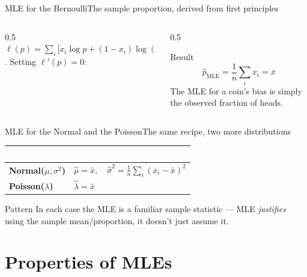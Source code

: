 \documentclass[aspectratio=169,11pt]{beamer}
\begin{document}
\begin{frame}{MLE for the Bernoulli}{The sample proportion, derived from first principles}
  \begin{columns}[T]
    \begin{column}{0.5\textwidth}
      \small $\ell(p) = \sum_i \big[x_i\log p + (1-x_i)\log(1-p)\big]$.
      Setting $\ell'(p)=0$:
    \end{column}
    \begin{column}{0.5\textwidth}
      \begin{exampleblock}{Result}
        \[ \hat p_{\text{MLE}} = \frac{1}{n}\sum_i x_i = \bar x \]
        \small The MLE for a coin's bias is simply the observed fraction of
        heads.
      \end{exampleblock}
    \end{column}
  \end{columns}
\end{frame}

\begin{frame}{MLE for the Normal and the Poisson}{The same recipe, two more distributions}
  \small
  \renewcommand{\arraystretch}{1.35}
  \begin{center}
  \begin{tabularx}{\textwidth}{@{}>{\bfseries}l >{\raggedright\arraybackslash}X@{}}
    \toprule
    \rowcolor{PrimaryDark}
    \textcolor{white}{Model} & \textcolor{white}{MLE} \\
    \midrule
    Normal($\mu,\sigma^2$) & $\hat\mu=\bar x, \quad \hat\sigma^2 = \frac1n\sum_i(x_i-\bar x)^2$ \\
    \rowcolor{PrimaryLight!25}
    Poisson($\lambda$) & $\hat\lambda = \bar x$ \\
    \bottomrule
  \end{tabularx}
  \end{center}
  \begin{exampleblock}{Pattern}
    \small In each case the MLE is a familiar sample statistic — MLE
    \emph{justifies} using the sample mean/proportion, it doesn't just
    assume it.
  \end{exampleblock}
\end{frame}

\section{Properties of MLEs}
\end{document}
